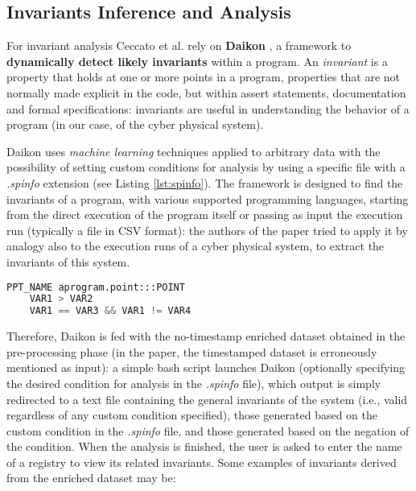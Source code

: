 \subsection{Invariants Inference and Analysis}
\label{subsec:ceccato_invariants}
For invariant analysis Ceccato et al. rely on \textbf{Daikon} \cite{daikon_site}, a framework to \textbf{dynamically detect likely invariants} within a program. An \textit{invariant} is a property that holds at one or more points in a program, properties that are not normally made explicit in the code, but within assert statements, documentation and formal specifications: invariants are useful in understanding the behavior of a program (in our case, of the cyber physical system).

Daikon uses \textit{machine learning} techniques applied to arbitrary data with the possibility of setting custom conditions for analysis by using a specific file \cite{daikon_spinfo} with a \textit{.spinfo} extension (see Listing \ref{lst:spinfo}). The framework is designed to find the invariants of a program, with various supported programming languages, starting from the direct execution of the program itself or passing as input the execution run (typically a file in CSV format): the authors of the paper tried to apply it by analogy also to the execution runs of a cyber physical system, to extract the invariants of this system.

\begin{lstlisting}[language=Python,numbers=none,caption={Generic example of a .spinfo file for customizing rules in Daikon},label=lst:spinfo]
	PPT_NAME aprogram.point:::POINT
	VAR1 > VAR2
	VAR1 == VAR3 && VAR1 != VAR4
\end{lstlisting}

Therefore, Daikon is fed with the no-timestamp enriched dataset obtained in the pre-processing phase (in the paper, the timestamped dataset is erroneously mentioned as input): a simple bash script launches Daikon (optionally specifying the desired condition for analysis in the \textit{.spinfo} file), which output is simply redirected to a text file containing the general invariants of the system (i.e., valid regardless of any custom condition specified), those generated based on the custom condition in the \textit{.spinfo} file, and those generated based on the negation of the condition. When the analysis is finished, the user is asked to enter the name of a registry to view its related invariants.\newline \newline
Some examples of invariants derived from the enriched dataset may be:

